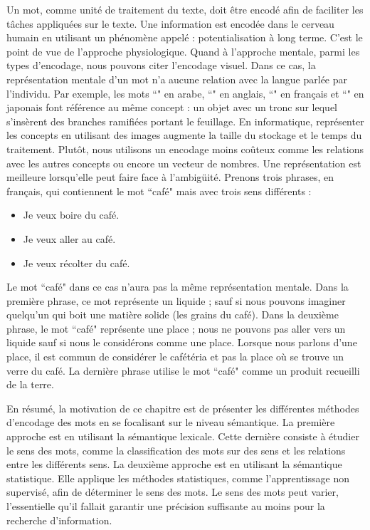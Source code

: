 \documentclass{KodeBook}
\begin{document}
Un mot, comme unité de traitement du texte, doit être encodé afin de faciliter les tâches appliquées sur le texte. 
Une information est encodée dans le cerveau humain en utilisant un phénomène appelé : potentialisation à long terme. 
C'est le point de vue de l'approche physiologique.
Quand à l'approche mentale, parmi les types d'encodage, nous pouvons citer l'encodage visuel. 
Dans ce cas, la représentation mentale d'un mot n'a aucune relation avec la langue parlée par l'individu.
Par exemple, les mots ``" en arabe, ``" en anglais, ``" en français et ``" en japonais font référence au même concept : un objet avec un tronc sur lequel s'insèrent des branches ramifiées portant le feuillage.
En informatique, représenter les concepts en utilisant des images augmente la taille du stockage et le temps du traitement. 
Plutôt, nous utilisons un encodage moins coûteux comme les relations avec les autres concepts ou encore un vecteur de nombres.
Une représentation est meilleure lorsqu'elle peut faire face à l'ambigüité. 
Prenons trois phrases, en français, qui contiennent le mot ``café" mais avec trois sens différents : 
\begin{itemize}
	\item Je veux boire du café.
	\item Je veux aller au café.
	\item Je veux récolter du café.
\end{itemize}
Le mot ``café" dans ce cas n'aura pas la même représentation mentale. 
Dans la première phrase, ce mot représente un liquide ; sauf si nous pouvons imaginer quelqu'un qui boit une matière solide (les grains du café). 
Dans la deuxième phrase, le mot ``café" représente une place ; nous ne pouvons pas aller vers un liquide sauf si nous le considérons comme une place. 
Lorsque nous parlons d'une place, il est commun de considérer le cafétéria et pas la place où se trouve un verre du café.
La dernière phrase utilise le mot ``café" comme un produit recueilli de la terre.

En résumé, la motivation de ce chapitre est de présenter les différentes méthodes d'encodage des mots en se focalisant sur le niveau sémantique.
La première approche est en utilisant la sémantique lexicale.
Cette dernière consiste à étudier le sens des mots, comme la classification des mots sur des sens et les relations entre les différents sens.
La deuxième approche est en utilisant la sémantique statistique.
Elle applique les méthodes statistiques, comme l'apprentissage non supervisé, afin de déterminer le sens des mots.
Le sens des mots peut varier, l'essentielle qu'il fallait garantir une précision suffisante au moins pour la recherche d'information.
\end{document}
